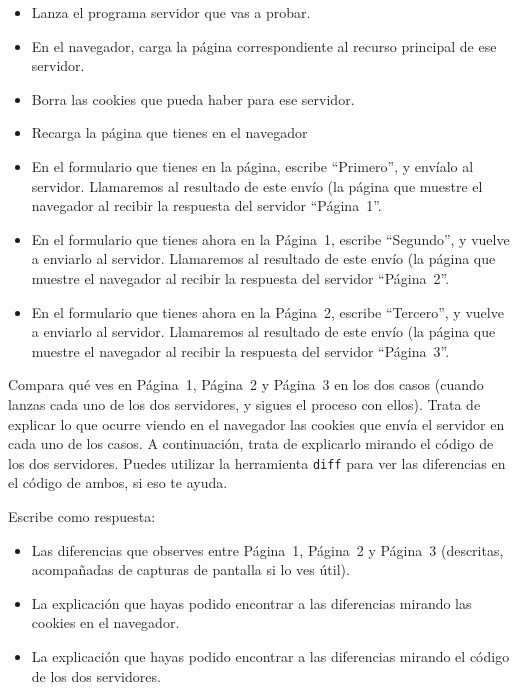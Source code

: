 \begin{itemize}
\item Lanza el programa servidor que vas a probar.
\item En el navegador, carga la página correspondiente al recurso principal de ese servidor.
\item Borra las cookies que pueda haber para ese servidor.
\item Recarga la página que tienes en el navegador
\item En el formulario que tienes en la página, escribe ``Primero'', y envíalo al servidor. Llamaremos al resultado de este envío (la página que muestre el navegador al recibir la respuesta del servidor ``Página~1''.
\item En el formulario que tienes ahora en la Página~1, escribe ``Segundo'', y vuelve a enviarlo al servidor. Llamaremos al resultado de este envío (la página que muestre el navegador al recibir la respuesta del servidor ``Página~2''.
\item En el formulario que tienes ahora en la Página~2, escribe ``Tercero'', y vuelve a enviarlo al servidor. Llamaremos al resultado de este envío (la página que muestre el navegador al recibir la respuesta del servidor ``Página~3''.
\end{itemize}

Compara qué ves en Página~1, Página~2 y Página~3 en los dos casos (cuando lanzas cada uno de los dos servidores, y sigues el proceso con ellos). Trata de explicar lo que ocurre viendo en el navegador las cookies que envía el servidor en cada uno de los casos. A continuación, trata de explicarlo mirando el código de los dos servidores. Puedes utilizar la herramienta \verb|diff| para ver las diferencias en el código de ambos, si eso te ayuda.

Escribe como respuesta:

\begin{itemize}
\item Las diferencias que observes entre Página~1, Página~2 y Página~3 (descritas, acompañadas de capturas de pantalla si lo ves útil).
\item La explicación que hayas podido encontrar a las diferencias mirando las cookies en el navegador.
\item La explicación que hayas podido encontrar a las diferencias mirando el código de los dos servidores.  
\end{itemize}

